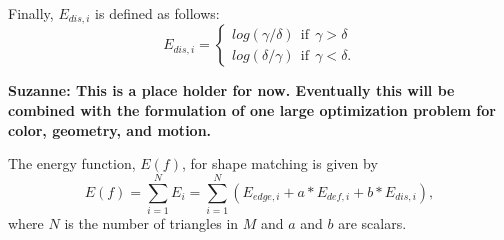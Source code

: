 Finally, $E_{dis, i}$ is defined as follows:
$$
E_{dis,i}=\left\{\begin{matrix}
log(\gamma / \delta ) \ \ \mathrm{if} \ \ \gamma > \delta \\
log(\delta / \gamma ) \ \ \mathrm{if} \ \ \gamma < \delta.
\end{matrix}\right.
$$

{\bf{Suzanne:  This is a place holder for now.  Eventually this will be 
combined with the formulation of one large optimization problem for 
color, geometry, and motion.}}

The energy function, $E(f)$, for shape matching is given by
\begin{equation}
E(f)=\sum_{i=1}^{N}E_{i}=\sum_{i=1}^{N}(E_{edge,i}+a*E_{def,i}+b*E_{dis,i}),
\end{equation} 
where $N$ is the number of triangles in $M$ and $a$ and $b$ are scalars. 
